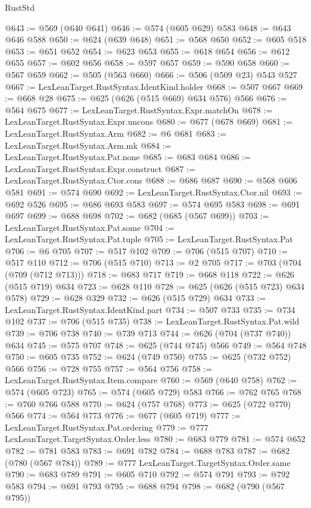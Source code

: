 \begin{lexlean}{RustStd}
\begin{coremodule}
{\begin{coremodule}
{{{{{{{{{{{{{{{@643 := @569 (@640 @641)
@646 := @574 (@605 @629) @583
@648 := @643 @646 @588
@650 := @624 (@639 @648)
@651 := @568 @650
@652 := @605 @518
@653 := @651 @652
@654 := @623 @653
@655 := @618 @654
@656 := @612 @655
@657 := @602 @656
@658 := @597 @657
@659 := @590 @658
@660 := @567 @659
@662 := @505 (@563 @660)
@666 := @506 (@509 @23) @543 @527
@667 := LexLeanTarget.RustSyntax.IdentKind.holder
@668 := @507 @667
@669 := @668 @28
@675 := @625 (@626 (@515 @669) @634 @576) @566
@676 := @564 @675
@677 := LexLeanTarget.RustSyntax.Expr.matchOn
@678 := LexLeanTarget.RustSyntax.Expr.uncons
@680 := @677 (@678 @669)
@681 := LexLeanTarget.RustSyntax.Arm
@682 := @6 @681
@683 := LexLeanTarget.RustSyntax.Arm.mk
@684 := LexLeanTarget.RustSyntax.Pat.none
@685 := @683 @684
@686 := LexLeanTarget.RustSyntax.Expr.construct
@687 := LexLeanTarget.RustSyntax.Ctor.cons
@688 := @686 @687
@690 := @568 @606 @581
@691 := @574 @690
@692 := LexLeanTarget.RustSyntax.Ctor.nil
@693 := @692 @526
@695 := @686 @693 @583
@697 := @574 @695 @583
@698 := @691 @697
@699 := @688 @698
@702 := @682 (@685 (@567 @699))
@703 := LexLeanTarget.RustSyntax.Pat.some
@704 := LexLeanTarget.RustSyntax.Pat.tuple
@705 := LexLeanTarget.RustSyntax.Pat
@706 := @6 @705
@707 := @517 @102
@709 := @706 (@515 @707)
@710 := @517 @110
@712 := @706 (@515 @710)
@713 := @2 @705
@717 := @703 (@704 (@709 (@712 @713)))
@718 := @683 @717
@719 := @668 @118
@722 := @626 (@515 @719) @634
@723 := @628 @110
@728 := @625 (@626 (@515 @723) @634 @578)
@729 := @628 @329
@732 := @626 (@515 @729) @634
@733 := LexLeanTarget.RustSyntax.IdentKind.part
@734 := @507 @733
@735 := @734 @102
@737 := @706 (@515 @735)
@738 := LexLeanTarget.RustSyntax.Pat.wild
@739 := @706 @738
@740 := @739 @713
@744 := @626 (@704 (@737 @740)) @634
@745 := @575 @707
@748 := @625 (@744 @745) @566
@749 := @564 @748
@750 := @605 @735
@752 := @624 (@749 @750)
@755 := @625 (@732 @752) @566
@756 := @728 @755
@757 := @564 @756
@758 := LexLeanTarget.RustSyntax.Item.compare
@760 := @569 (@640 @758)
@762 := @574 (@605 @723)
@765 := @574 (@605 @729) @583
@766 := @762 @765
@768 := @760 @766 @588
@770 := @624 (@757 @768)
@773 := @625 (@722 @770) @566
@774 := @564 @773
@776 := @677 (@605 @719)
@777 := LexLeanTarget.RustSyntax.Pat.ordering
@779 := @777 LexLeanTarget.TargetSyntax.Order.less
@780 := @683 @779
@781 := @574 @652
@782 := @781 @583
@783 := @691 @782
@784 := @688 @783
@787 := @682 (@780 (@567 @784))
@789 := @777 LexLeanTarget.TargetSyntax.Order.same
@790 := @683 @789
@791 := @605 @710
@792 := @574 @791
@793 := @792 @583
@794 := @691 @793
@795 := @688 @794
@798 := @682 (@790 (@567 @795))
}}}}}}}}}}}}}}}
\end{coremodule}}
\end{coremodule}
\end{lexlean}

